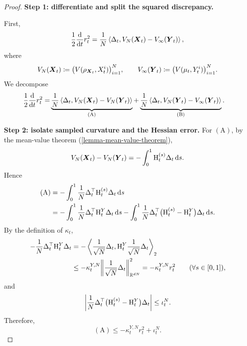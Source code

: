\begin{proof}
\noindent\textbf{Step 1: differentiate and split the squared discrepancy.}

First,
\begin{equation}
    \frac{1}{2}\frac{\dd}{\dd t}r_t^2
    =
    \frac{1}{N}
    \left\langle \Delta_t,V_N(\boldsymbol{X}_t)-V_\infty(\boldsymbol{Y}_t)\right\rangle,
\end{equation}
where
\begin{equation}
    V_N(\boldsymbol{X}_t)
    \coloneq
    \bigl(V(\rho_{\boldsymbol{X}_t},X_t^i)\bigr)_{i=1}^N,
    \qquad
    V_\infty(\boldsymbol{Y}_t)
    \coloneq
    \bigl(V(\mu_t,Y_t^i)\bigr)_{i=1}^N.
\end{equation}
We decompose
\begin{align}
    \frac{1}{2}\frac{\dd}{\dd t}r_t^2
    =&
    \underbrace{
        \frac{1}{N}
        \left\langle \Delta_t,V_N(\boldsymbol{X}_t)-V_N(\boldsymbol{Y}_t)\right\rangle
    }_{\mathrm{(A)}}
    +
    \underbrace{
        \frac{1}{N}
        \left\langle \Delta_t,V_N(\boldsymbol{Y}_t)-V_\infty(\boldsymbol{Y}_t)\right\rangle
    }_{\mathrm{(B)}}.
\end{align}


\par\noindent\textbf{Step 2: isolate sampled curvature and the Hessian error.}
For \(\mathrm{(A)}\), by the mean-value theorem (\cref{lemma-mean-value-theorem}),
\begin{equation}
    V_N(\boldsymbol{X}_t)-V_N(\boldsymbol{Y}_t)
    =
    -\int_0^1 \mathrm{H}_t^{(s)} \Delta_t\,\dd s.
\end{equation}
Hence
\begin{align}
    \mathrm{(A)}
    &=
    -\int_0^1
    \frac{1}{N}\Delta_t^\top \mathrm{H}_t^{(s)}\Delta_t\,\dd s \\
    &=
    -\int_0^1
    \frac{1}{N}\Delta_t^\top \mathrm{H}_t^Y \Delta_t\,\dd s
    -
    \int_0^1
    \frac{1}{N}\Delta_t^\top
    \bigl(\mathrm{H}_t^{(s)}-\mathrm{H}_t^Y\bigr)
    \Delta_t\,\dd s.
\end{align}
By the definition of \(\kappa_t\),
\begin{equation}
 \begin{aligned}
    -\frac{1}{N}\Delta_t^\top \mathrm{H}_t^{Y}\Delta_t
    &=-\left\langle \frac{1}{\sqrt{N}}\Delta_t,\mathrm{H}_t^Y \frac{1}{\sqrt{N}}\Delta_t\right\rangle_2\\
    &\le-\kappa_t^{Y,N} \norm{\frac{1}{\sqrt{N}}\Delta_t}_{\mathbb R^{dN}}^2
     =-\kappa_t^{Y,N}r_t^2\qquad(\forall s\in[0,1]),
 \end{aligned}
\end{equation}
and                                     
\begin{equation}
    \left|\frac{1}{N}\Delta_t^\top
    \bigl(\mathrm{H}_t^{(s)}- \mathrm{H}_t^{Y}\bigr)\Delta_t
    \right|
    \le
    \iota_t^N.
\end{equation}
Therefore,
\begin{equation}
    \mathrm{(A)}
    \le
    -\kappa_t^{Y,N} r_t^2 
    + \iota_t^N.
\end{equation}



\end{proof}
